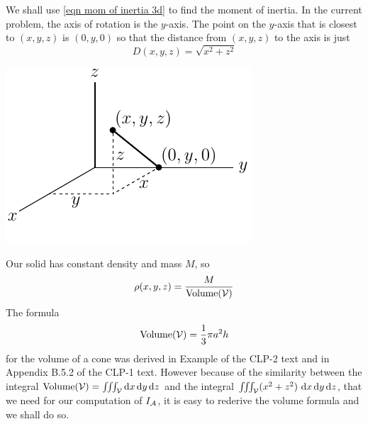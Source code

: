 \begin{eg}
We shall use \eqref{eqn mom of inertia 3d} to find the moment of inertia.
In the current problem, the axis of rotation is the $y$-axis. The point on the 
$y$-axis that is closest to $(x,y,z)$ is $(0,y,0)$ so that the distance from $(x,y,z)$ to the axis is just
\begin{equation*}
D(x,y,z) = \sqrt{x^2+z^2}
\end{equation*}
\begin{efig}
\begin{center}
    \includegraphics{cart6}
\end{center}
\end{efig}
Our solid has constant density and mass $M$, so
\begin{equation*}
\rho(x,y,z) = \frac{M}{\text{Volume}(\mathcal{V})}
\end{equation*}
The formula
\begin{equation*}
\text{Volume}(\mathcal{V})= \frac{1}{3} \pi a^2 h
\end{equation*}
for the volume of a cone was derived in Example  
of the CLP-2 text and in Appendix B.5.2 of the CLP-1 text. 
However because of the similarity between
the integral 
$\text{Volume}(\mathcal{V})=\iiint_{\mathcal{V}} \mathrm{d}x\,\mathrm{d}y\,\mathrm{d}z$ 
and the integral
$\tripInt_\cV (x^2+z^2)\ \dee{x}\,\dee{y}\,\dee{z}$, that we need for our
computation of $I_{\mathcal{A}}$, it is easy to rederive the volume formula and we 
shall do so.



\end{eg}
